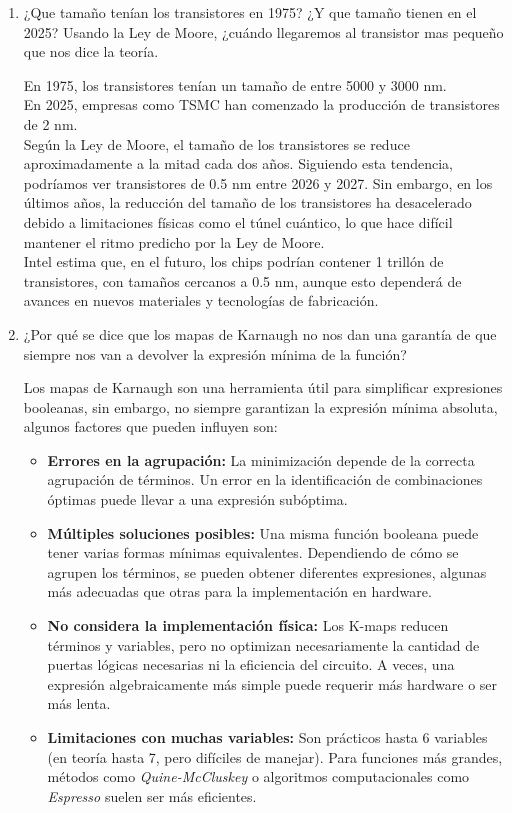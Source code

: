 \documentclass[12pt,letterpaper]{article}
\begin{document}
\begin{enumerate}
  \item ¿Que tamaño tenían los transistores en 1975? ¿Y que tamaño tienen en el 2025? Usando la Ley de Moore, ¿cuándo llegaremos al transistor mas pequeño que nos dice la teoría.
    
    \bigskip
    En 1975, los transistores tenían un tamaño de entre 5000 y 3000 nm.\\
    En 2025, empresas como TSMC han comenzado la producción de transistores de 2 nm.\\
    Según la Ley de Moore, el tamaño de los transistores se reduce aproximadamente a la mitad cada dos años. Siguiendo esta tendencia, podríamos ver transistores de 0.5 nm entre 2026 y 2027. Sin embargo, en los últimos años, la reducción del tamaño de los transistores ha desacelerado debido a limitaciones físicas como el túnel cuántico, lo que hace difícil mantener el ritmo predicho por la Ley de Moore.\\
    Intel estima que, en el futuro, los chips podrían contener 1 trillón de transistores, con tamaños cercanos a 0.5 nm, aunque esto dependerá de avances en nuevos materiales y tecnologías de fabricación.
    
  \item ¿Por qué se dice que los mapas de Karnaugh no nos dan una garantía de que siempre nos van a devolver la expresión mínima de la función?
    
    \bigskip
    Los mapas de Karnaugh son una herramienta útil para simplificar expresiones booleanas, sin embargo, no siempre garantizan la expresión mínima absoluta, algunos factores que pueden influyen son:
    
    \begin{itemize}
    \item \textbf{Errores en la agrupación:}
      La minimización depende de la correcta agrupación de términos. Un error en la identificación de combinaciones óptimas puede llevar a una expresión subóptima.

    \item \textbf{Múltiples soluciones posibles:}
      Una misma función booleana puede tener varias formas mínimas equivalentes. Dependiendo de cómo se agrupen los términos, se pueden obtener diferentes expresiones, algunas más adecuadas que otras para la implementación en hardware.
      
    \item \textbf{No considera la implementación física:}
      Los K-maps reducen términos y variables, pero no optimizan necesariamente la cantidad de puertas lógicas necesarias ni la eficiencia del circuito. A veces, una expresión algebraicamente más simple puede requerir más hardware o ser más lenta.
      
    \item \textbf{Limitaciones con muchas variables:}
      Son prácticos hasta 6 variables (en teoría hasta 7, pero difíciles de manejar). Para funciones más grandes, métodos como \textit{Quine-McCluskey} o algoritmos computacionales como \textit{Espresso} suelen ser más eficientes.
    \end{itemize}
\end{enumerate}
\end{document}
